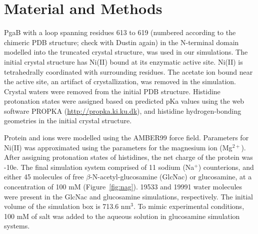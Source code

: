 

\section{Material and Methods}
PgaB with a loop spanning residues 613 to 619 (numbered according to the chimeric PDB structure; check with Dustin again) in the N-terminal domain modelled into the truncated crystal structure, was used in our simulations. The initial crystal structure has Ni(II) bound at its enzymatic active site. Ni(II) is tetrahedrally coordinated with surrounding residues.  The acetate ion bound near the active site, an artifact of crystallization, was removed in the simulation. Crystal waters were removed from the initial PDB structure. Histidine protonation states were assigned based on predicted pKa values using the web software PROPKA (\url{http://propka.ki.ku.dk}), and histidine hydrogen-bonding geometries in the initial crystal structure.

Protein and ions were modelled using the AMBER99 force field.\cite{Cornell:1995td} Parameters for Ni(II) was approximated using the parameters for the magnesium ion (Mg$^{2+}$). After assigning protonation states of histidines, the net charge of the protein was -10e. The final simulation system comprised of 11 sodium (Na$^{+}$) counterions, and either 45 molecules of free $\beta$-N-acetyl-glucosamine (GlcNac) or glucosamine, at a concentration of 100 mM (Figure~\ref{fig:nag}). 19533 and 19991 water molecules were present in the GlcNac and glucosamine simulations, respectively. The initial volume of the simulation box is 713.6 nm$^{3}$.  To mimic experimental conditions, 100 mM of salt was added to the aqueous solution in glucosamine simulation systems.

